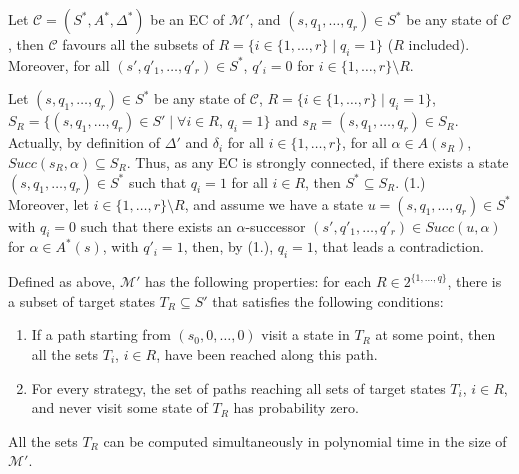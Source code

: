 \begin{lemma} \label{lemma-favour}  Let $\mathcal{C} = (S^*, A^*, \Delta^*)$ be an EC of $\mathcal{M}'$, and $(s, q_1, \dots, q_r) \in S^*$ be any state of $\mathcal{C}$, then $\mathcal{C}$ favours all the subsets of $R = \{ i \in \{1, \dots, r\} \; | \; q_i = 1\}$ ($R$ included).
  Moreover, for all $(s', q'_1, \dots, q'_r) \in S^*$, $q'_i = 0$ for $i \in \{1, \dots, r\} \setminus R$.
\end{lemma}
\begin{proof2}
Let $(s, q_1, \dots, q_r)\in S^*$ be any state of $\mathcal{C}$,  $R = \{ i \in \{1, \dots, r\} \; | \; q_i = 1\}$, $S_R = \{ (s, q_1, \dots, q_r) \in S' \; | \; \forall i \in R, \, q_i = 1 \}$ and $s_R = (s, q_1, \dots, q_r) \in S_R$.
Actually, by definition of $\Delta'$ and $\delta_i$ for all $i \in \{1, \dots, r\}$, for all $\alpha \in A(s_R)$, $Succ(s_R, \alpha) \subseteq S_R$.
Thus, as any EC is strongly connected,
if there exists a state $(s, q_1, \dots, q_r) \in S^*$ such that $q_i = 1$ for all $i \in R$, then $S^* \subseteq S_R$. {\color{umons-red}(1.)} \\
Moreover, let $i \in \{1, \dots, r \} \setminus R$, and assume we have a state $u = (s, q_1, \dots, q_r) \in S^*$ with $q_i = 0$ such that there exists an $\alpha$-successor $(s', q'_1, \dots, q'_r) \in Succ(u, \alpha)$ for $\alpha \in A^*(s)$, with $q'_i = 1$, then, by {\color{umons-red}(1.)}, $q_i = 1$, that leads a contradiction.
\end{proof2}

\begin{lemma} \label{MOSR-lemme}
Defined as above, $\mathcal{M}'$ has the following properties: for each $R \in 2^{\{1, \dots, q\}}$, there is a subset of target states $T_R \subseteq S'$ that satisfies the following conditions:
\begin{enumerate}[(1.)]
  \item If a path starting from $(s_0, 0, \dots, 0)$ visit a state in $T_R$ at some point, then
  all the sets $T_i$, $i \in R$, have been reached along this path.
  \label{Mprime1}
  \item For every strategy, the set of paths reaching all sets of target states $T_i$, $i \in R$, and never visit some state of $T_R$ has probability zero. \label{Mprime2}
\end{enumerate}
All the sets $T_R$ can be computed simultaneously
in polynomial time in the size of $\mathcal{M}'$.
\end{lemma}

